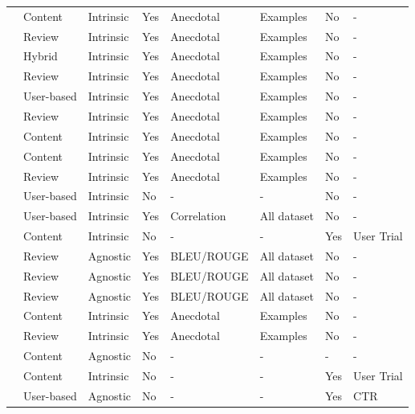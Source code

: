 \begin{tabular}{llllllll}
\cite{10.1145/3308558.3313705} & Content & Intrinsic & Yes & Anecdotal & Examples & No & - \\
\cite{10.1145/3397271.3401137} & Review & Intrinsic & Yes & Anecdotal & Examples & No & - \\
\cite{10.1145/3343031.3351034} & Hybrid & Intrinsic & Yes & Anecdotal & Examples & No & - \\
\cite{10.1145/2806416.2806504} & Review & Intrinsic & Yes & Anecdotal & Examples & No & - \\
\cite{10.1145/3159652.3159668} & User-based & Intrinsic & Yes & Anecdotal & Examples & No & - \\
\cite{10.1145/3109859.3109890} & Review & Intrinsic & Yes & Anecdotal & Examples & No & - \\
\cite{10.1145/3331184.3331203} & Content & Intrinsic & Yes & Anecdotal & Examples & No & - \\
\cite{10.1145/3442381.3450133} & Content & Intrinsic & Yes & Anecdotal & Examples & No & - \\
\cite{10.1145/3178876.3186145} & Review & Intrinsic & Yes & Anecdotal & Examples & No & - \\
\cite{10.1145/3178876.3186154} & User-based & Intrinsic & No & - & - & No & - \\
\cite{10.1145/3442381.3449788} & User-based & Intrinsic & Yes & Correlation & All dataset & No & - \\
\cite{10.1145/3631700.3665226} & Content & Intrinsic & No & - & - & Yes & User Trial \\
\cite{10.1145/3637528.3671781} & Review & Agnostic & Yes & BLEU/ROUGE & All dataset & No & - \\
\cite{10.1145/3543507.3583260} & Review & Agnostic & Yes & BLEU/ROUGE & All dataset & No & - \\
\cite{10.1145/3624918.3625331} & Review & Agnostic & Yes & BLEU/ROUGE & All dataset & No & - \\
\cite{10.1145/3485447.3511937} & Content & Intrinsic & Yes & Anecdotal & Examples & No & - \\
\cite{10.1145/3485447.3512029} & Review & Intrinsic & Yes & Anecdotal & Examples & No & - \\
\cite{10.1145/3604915.3609491} & Content & Agnostic & No & - & - & - & - \\
\cite{10.1145/3636555.3636898} & Content & Intrinsic & No & - & - & Yes & User Trial \\
\cite{10.1145/3616855.3635855} & User-based & Agnostic & No & - & - & Yes & CTR \\

\end{tabular}
